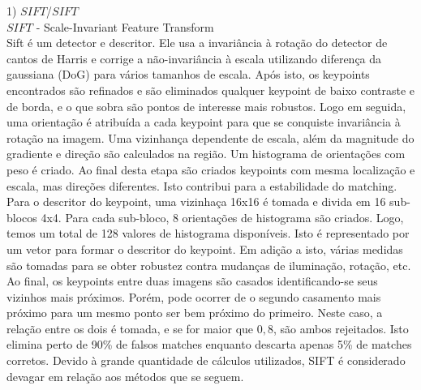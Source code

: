 \documentclass[conference]{IEEEtran}
\begin{document}
	 1) $SIFT$/$SIFT$	\\
	 $SIFT$ - Scale-Invariant Feature Transform \\
	 Sift \'e um detector e descritor. Ele usa a invari\^ancia \`a rota\c{c}\~ao do 
	 detector de cantos de Harris e corrige a n\~ao-invari\^ancia \`a escala utilizando diferen\c{c}a da gaussiana (DoG) para
	 v\'arios tamanhos de escala. Ap\'os isto, os keypoints encontrados s\~ao refinados e s\~ao
	 eliminados qualquer keypoint de baixo contraste e de borda, e o que sobra s\~ao pontos de interesse mais robustos.
	 Logo em seguida, uma orienta\c{c}\~ao \'e atribu\'ida a cada keypoint para que se conquiste invari\^ancia \`a rota\c{c}\~ao
	 na imagem. Uma vizinhan\c{c}a dependente de escala, al\'em da magnitude do gradiente e dire\c{c}\~ao s\~ao calculados
	 na regi\~ao. Um histograma de orienta\c{c}\~oes com peso \'e criado. Ao final desta etapa s\~ao criados keypoints 
	 com mesma localiza\c{c}\~ao e escala, mas dire\c{c}\~oes diferentes. Isto contribui para a estabilidade do matching.
	 Para o descritor do keypoint, uma vizinha\c{c}a 16x16 \'e tomada e divida em 16 sub-blocos 4x4. Para cada sub-bloco, 
	 8 orienta\c{c}\~oes de histograma s\~ao criados. Logo, temos um total de 128 valores de histograma dispon\'iveis.
	 Isto \'e representado por um vetor para formar o descritor do keypoint. Em adi\c{c}\~ao a isto, v\'arias medidas s\~ao
	 tomadas para se obter robustez contra mudan\c{c}as de ilumina\c{c}\~ao, rota\c{c}\~ao, etc.
	 Ao final, os keypoints entre duas imagens s\~ao casados identificando-se seus vizinhos mais pr\'oximos. Por\'em, pode
	 ocorrer de o segundo casamento mais pr\'oximo para um mesmo ponto ser bem pr\'oximo do primeiro. Neste caso, a
	 rela\c{c}\~ao entre os dois \'e tomada, e se for maior que $0,8$, s\~ao ambos rejeitados. Isto elimina perto de 90\%
	 de falsos matches enquanto descarta apenas 5\% de matches corretos.
	 Devido \`a grande quantidade de c\'alculos utilizados, SIFT \'e considerado devagar em rela\c{c}\~ao aos m\'etodos 
	 que se seguem. \\
	 
\end{document}
